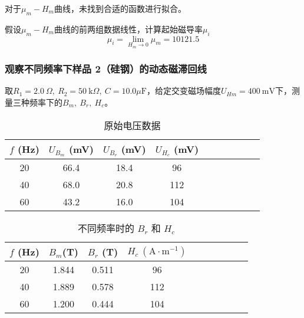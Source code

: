 \documentclass[11pt]{article}
\begin{document}
	对于$\mu_m-H_m$曲线，未找到合适的函数进行拟合。
	
	假设$\mu_m-H_m$曲线的前两组数据线性，计算起始磁导率$\mu_i$
	\[\mu_i=\lim_{H_m \to 0} \mu_m = 10121.5\]
	
	
	
	
	\subsubsection{观察不同频率下样品 2（硅钢）的动态磁滞回线}
	取$R_1=2.0\ \Omega , \ R_2=50\ \mathrm{k}\Omega ,\ C=10.0\mu \mathrm{F}$，给定交变磁场幅度$U_{Hm}=400\ \mathrm{mV}$下，测量三种频率下的$B_m,\ B_r,\ H_c$。
	\begin{center}
		\noindent\begin{minipage}{0.49\columnwidth}
			\begin{table}[H]\centering
				\caption{原始电压数据}
				\begin{tabular}{cccccccccc}\toprule
					$f$ (Hz) & $U_{B_m}$ (mV) & $U_{B_r}$ (mV) & $U_{H_c} $ (mV)  \\
					\midrule
					20  &  66.4& 18.4 &   96\\
					40 & 68.0 &20.8 &   112\\
					60 & 43.2 &16.0 & 104 \\
					\bottomrule
				\end{tabular}
			\end{table}
		\end{minipage}\begin{minipage}{0.49\columnwidth}
			\begin{table}[H]\centering
				\caption{不同频率时的 $B_r$ 和 $H_c$}
				\begin{tabular}{cccccccccc}\toprule
					$f$ (Hz) &$B_m$(T) &$B_r$ (T) & $H_c \ (\mathrm{A\cdot m^{-1}})$  \\
					\midrule
					20  &  1.844 & 0.511 &   96\\
					40 & 1.889 &0.578&   112\\
					60 & 1.200 &0.444 & 104 \\
					\bottomrule
				\end{tabular}
			\end{table}
		\end{minipage}
	\end{center}
	
\end{document}
